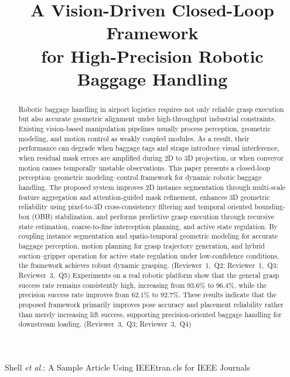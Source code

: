 \documentclass[lettersize,journal]{IEEEtran}
\DeclareRobustCommand{\reviewnote}[1]{{\normalfont\footnotesize\hyphenpenalty=10000\exhyphenpenalty=10000\color{blue}(#1)}}
\DeclareRobustCommand{\revadd}[1]{{\color{red}#1}}
\begin{document}
\title{A Vision-Driven Closed-Loop Framework  \\ for High-Precision Robotic Baggage Handling}



%
{Shell \MakeLowercase{\textit{et al.}}: A Sample Article Using IEEEtran.cls for IEEE Journals}



\maketitle

\begin{abstract}
Robotic baggage handling in airport logistics requires not only reliable grasp execution but also accurate geometric alignment under high-throughput industrial constraints. Existing vision-based manipulation pipelines usually process perception, geometric modeling, and motion control as weakly coupled modules. As a result, their performance can degrade when baggage tags and straps introduce visual interference, when residual mask errors are amplified during 2D to 3D projection, or when conveyor motion causes temporally unstable observations. This paper presents a closed-loop perception--geometric modeling--control framework for dynamic robotic baggage handling. The proposed system improves 2D instance segmentation through multi-scale feature aggregation and attention-guided mask refinement, enhances 3D geometric reliability using pixel-to-3D cross-consistency filtering and temporal oriented bounding-box (OBB) stabilization, and performs predictive grasp execution through recursive state estimation, coarse-to-fine interception planning, and active state regulation. \revadd{By coupling instance segmentation and spatio-temporal geometric modeling for accurate baggage perception, motion planning for grasp trajectory generation, and hybrid suction--gripper operation for active state regulation under low-confidence conditions, the framework achieves robust dynamic grasping.} \reviewnote{\mbox{Reviewer 1, Q2}; \mbox{Reviewer 1, Q3}; \mbox{Reviewer 3, Q5}} Experiments on a real robotic platform show that the general grasp success rate remains consistently high, increasing from 93.6\% to 96.4\%, while the precision success rate improves from 62.1\% to 92.7\%. These results indicate that the proposed framework primarily improves pose accuracy and placement reliability rather than merely increasing lift success, \revadd{supporting precision-oriented baggage handling for downstream loading.} \reviewnote{\mbox{Reviewer 3, Q3}; \mbox{Reviewer 3, Q4}}
\end{abstract}
\end{document}
